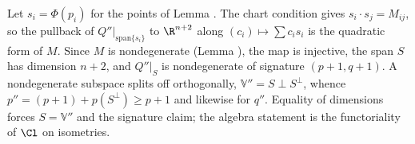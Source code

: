 Let $s_i = \Phi(p_i)$ for the points of Lemma . The chart condition gives $s_i \cdot s_j = M_{ij}$, so the pullback of $Q''|_{\mathrm{span}\{s_i\}}$ to $\R^{n+2}$ along $(c_i) \mapsto \sum c_i s_i$ is the quadratic form of $M$. Since $M$ is nondegenerate (Lemma ), the map is injective, the span $S$ has dimension $n+2$, and $Q''|_S$ is nondegenerate of signature $(p{+}1, q{+}1)$. A nondegenerate subspace splits off orthogonally, $\mathbb{V}'' = S \perp S^\perp$, whence $p'' = (p{+}1) + p(S^\perp) \geq p+1$ and likewise for $q''$. Equality of dimensions forces $S = \mathbb{V}''$ and the signature claim; the algebra statement is the functoriality of $\Cl$ on isometries.
